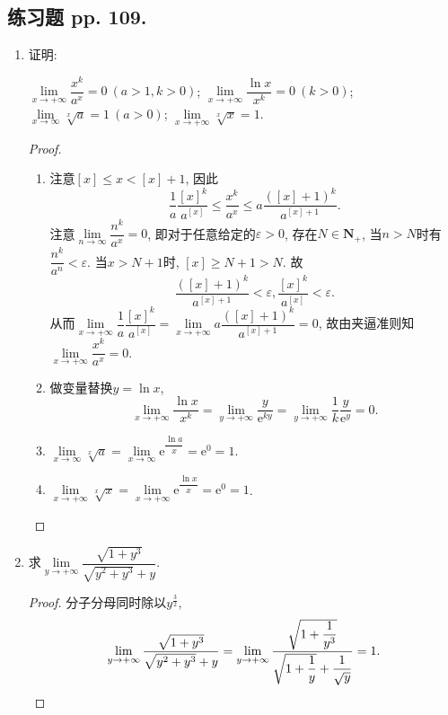 \documentclass[a4paper,11pt,twoside]{ctexbook}
\newcommand{\e}{\mathrm e}
\begin{document}
\subsection{练习题 pp. 109.}
\begin{enumerate}
	\item 证明:
	      \begin{tabenum}[(1)]
		      \tabenumitem $\lim\limits_{x\to+\infty} \dfrac{x^k}{a^x}=0 \ (a>1,k>0)$;
		      \tabenumitem $\lim\limits_{x\to+\infty} \dfrac{\ln{x}}{x^k}=0 \ (k>0)$;\\
		      \tabenumitem $\lim\limits_{x\to\infty} \sqrt[x]{a}=1 \ (a>0)$;
		      \tabenumitem $\lim\limits_{x\to+\infty} \sqrt[x]{x}=1$.
	      \end{tabenum}
	      \begin{proof}
		      \begin{enumerate}[(1)]
			      \item 注意$[x]\leqslant x<[x]+1$, 因此
			            \[
				            \dfrac{1}{a}\dfrac{[x]^k}{a^[x]}\leqslant\dfrac{x^k}{a^x}\leqslant a\dfrac{([x]+1)^k}{a^{[x]+1}}.
			            \]
			            注意$\lim\limits_{n\to\infty} \dfrac{n^k}{a^x}=0$, 即对于任意给定的$\varepsilon>0$, 存在$N\in\mathbf{N}_{+}$, 当$n>N$时有$\dfrac{n^k}{a^n}<\varepsilon$. 当$x>N+1$时, $[x]\geqslant N+1>N$. 故
			            \[
				            \dfrac{([x]+1)^k}{a^{[x]+1}}<\varepsilon, \dfrac{[x]^k}{a^{[x]}}<\varepsilon.
			            \]
			            从而$\lim\limits_{x\to+\infty} \dfrac{1}{a}\dfrac{[x]^k}{a^[x]}=\lim\limits_{x\to+\infty} a\dfrac{([x]+1)^k}{a^{[x]+1}}=0$, 故由夹逼准则知$\lim\limits_{x\to+\infty} \dfrac{x^k}{a^x}=0$.

			      \item 做变量替换$y=\ln{x}$,
			            \[
				            \lim\limits_{x\to+\infty} \dfrac{\ln{x}}{x^k}=\lim\limits_{y\to+\infty} \dfrac{y}{\e^{ky}}=\lim\limits_{y\to+\infty} \dfrac{1}{k}\dfrac{y}{\e^y}=0.
			            \]

			      \item $\lim\limits_{x\to\infty} \sqrt[x]{a}=\lim\limits_{x\to\infty} \e^{\dfrac{\ln{a}}{x}} =\e^0=1$.

			      \item $\lim\limits_{x\to+\infty} \sqrt[x]{x}=\lim\limits_{x\to+\infty} \e^{\dfrac{\ln{x}}{x}}=\e^0=1$. \qedhere
		      \end{enumerate}
	      \end{proof}

	\item 求$\lim\limits_{y\to+\infty} \dfrac{\sqrt{1+y^3}}{\sqrt{y^2+y^3}+y}$.
	      \begin{proof}
		      分子分母同时除以$y^{\frac{3}{2}}$,
		      \[
			      \lim\limits_{y\to+\infty} \dfrac{\sqrt{1+y^3}}{\sqrt{y^2+y^3}+y}=\lim\limits_{y\to+\infty} \dfrac{\sqrt{1+\dfrac{1}{y^3}}}{\sqrt{1+\dfrac{1}{y}}+\dfrac{1}{\sqrt{y}}}=1. \qedhere
		      \]
	      \end{proof}


\end{enumerate}
\end{document}
